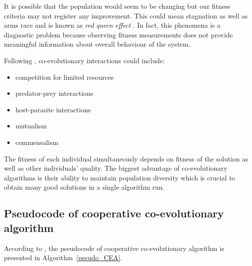 It is possible that the population would seem to be changing but our fitness criteria may not register any improvement.
This could mean stagnation as well as arms race and is known as \emph{red queen effect} \cite{co-evol}.
In fact, this phenomena is a diagnostic problem because observing fitness measurements does not provide meaningful information about overall behaviour of the system.
 


Following \cite{Dre}, co-evolutionary interactions could include:

\begin{itemize}
  \item competition for limited resources
  \item predator-prey interactions
  \item host-parasite interactions
  \item mutualism
  \item commensalism
\end{itemize}

The fitness of each individual simultaneously depends on fitness of the solution as well as other individuals' quality.
The biggest advantage of co-evolutionary algorithms is their ability to maintain population diversity which is crucial to obtain many good solutions in a single algorithm run.    

  
\subsection{Pseudocode of cooperative co-evolutionary algorithm}

According to \cite{co-evol}, the pseudocode of cooperative co-evolutionary algorithm is presented in Algorithm~\ref{pseudo_CEA}.

% 
% 
% 
% 
% 

